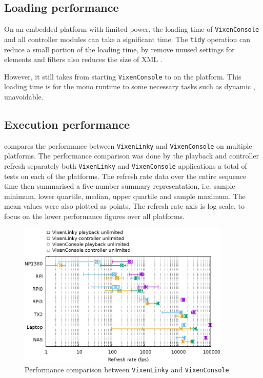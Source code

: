 \subsection{Loading performance}

On an embedded platform with limited  power, the loading time of \texttt{VixenConsole} and all controller modules can take a significant  time. The \texttt{tidy} operation can reduce a small portion of the loading time, by remove unused settings for elements and filters also reduces the size of XML .

However, it still takes  from starting \texttt{VixenConsole} to  on the  platform. This loading time is for the mono runtime to  some necessary tasks such as  dynamic ,  unavoidable.

\subsection{Execution performance}

 compares the performance between \texttt{VixenLinky} and \texttt{VixenConsole} on multiple platforms. The performance comparison was done by  the playback and controller refresh  separately  both \texttt{VixenLinky} and \texttt{VixenConsole} applications\ca{;} a total of  tests on each of the platforms. The refresh rate data over the entire sequence time  then summarised  a five-number summary representation, i.e. sample minimum, lower quartile, median, upper quartile and sample maximum. The mean values were also plotted as points. The refresh rate axis is  log scale, to focus on the lower performance figures over all platforms.

\begin{figure}[t]
  \centering
  \includegraphics[width=0.9\textwidth]{Figs/raw-seq-p-c.eps}
  \caption{\footnotesize Performance comparison between \texttt{VixenLinky} and \texttt{VixenConsole}}
  \label{fig:raw-seq-p-c}
\end{figure}

